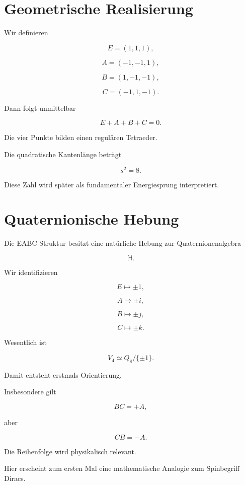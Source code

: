 \documentclass[11pt,a4paper]{article}
\begin{document}
	\section{Geometrische Realisierung}
	
	Wir definieren
	
	\[
	E=(1,1,1),
	\]
	
	\[
	A=(-1,-1,1),
	\]
	
	\[
	B=(1,-1,-1),
	\]
	
	\[
	C=(-1,1,-1).
	\]
	
	Dann folgt unmittelbar
	
	\[
	E+A+B+C=0.
	\]
	
	Die vier Punkte bilden einen regulären Tetraeder.
	
	Die quadratische Kantenlänge beträgt
	
	\[
	s^2=8.
	\]
	
	Diese Zahl wird später
	als fundamentaler Energiesprung interpretiert.
	
	\section{Quaternionische Hebung}
	
	Die EABC-Struktur besitzt eine natürliche Hebung
	zur Quaternionenalgebra
	
	\[
	\mathbb H.
	\]
	
	Wir identifizieren
	
	\[
	E \mapsto \pm1,
	\]
	
	\[
	A \mapsto \pm i,
	\]
	
	\[
	B \mapsto \pm j,
	\]
	
	\[
	C \mapsto \pm k.
	\]
	
	Wesentlich ist
	
	\[
	V_4
	\simeq
	Q_8/\{\pm1\}.
	\]
	
	Damit entsteht erstmals Orientierung.
	
	Insbesondere gilt
	
	\[
	BC=+A,
	\]
	
	aber
	
	\[
	CB=-A.
	\]
	
	Die Reihenfolge wird physikalisch relevant.
	
	Hier erscheint zum ersten Mal
	eine mathematische Analogie zum Spinbegriff Diracs.
	
\end{document}

